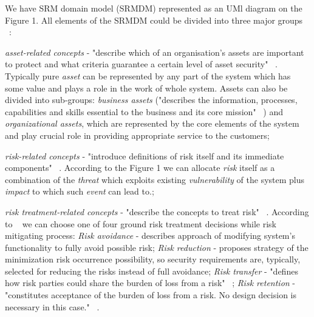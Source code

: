 \documentclass[12pt]{article}
\begin{document}
We have  SRM domain model (SRMDM) represented as an UMl diagram on the Figure 1. All elements of the SRMDM could be divided into three major groups ~\cite{FSSM}: 
\begin{enumerate*}[label=(\roman*)]
	\item \textit{asset-related concepts} - "describe which of an organisation’s assets are important to protect and what criteria guarantee a certain level of asset security" ~\cite{FSSM}. Typically pure \textit{asset} can be represented by any part of the system which has some value and plays a role in the work of whole system. Assets can also be divided into sub-groups: \textit{business assets} ("describes the information, processes, capabilities and skills essential to the business and its core mission"  ~\cite{FSSM})  and \textit{organizational assets}, which are represented by the core elements of the system and play crucial role in providing appropriate service to the customers;
	\item \textit{risk-related concepts} - "introduce definitions of risk itself and its immediate components" ~\cite{FSSM}. According to the Figure 1 we can allocate \textit{risk} itself as a combination of the \textit{threat} which exploits existing \textit{vulnerability} of the system plus \textit{impact} to which such \textit{event} can lead to.;
	\item \textit{risk treatment-related concepts} - "describe the concepts to treat risk"  ~\cite{FSSM}. According to  ~\cite{FSSM} we can choose one of four ground risk treatment decisions while risk mitigating process: \textit{Risk avoidance} - describes approach of modifying system's functionality to fully avoid possible risk; \textit{Risk reduction} - proposes strategy of the minimization risk occurrence possibility, so security requirements are, typically, selected for
	reducing the risks instead of full avoidance; \textit{Risk transfer} - "defines how risk parties could share the burden of loss from a risk"  ~\cite{FSSM}; \textit{Risk retention} - "constitutes acceptance of the burden of loss from a risk. No design decision is necessary in this case." ~\cite{FSSM}. 
\end{enumerate*} 
\end{document}
